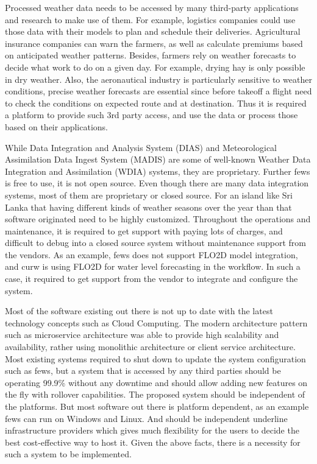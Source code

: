 Processed weather data needs to be accessed by many third-party applications and research to make use of them. For example, logistics companies could use those data with their models to plan and schedule their deliveries. Agricultural insurance companies can warn the farmers, as well as calculate premiums based on anticipated weather patterns. Besides, farmers rely on weather forecasts to decide what work to do on a given day. For example, drying hay is only possible in dry weather. Also, the aeronautical industry is particularly sensitive to weather conditions, precise weather forecasts are essential since before takeoff a flight need to check the conditions on expected route and at destination.
Thus it is required a platform to provide such 3rd party access, and use the data or process those based on their applications.

While Data Integration and Analysis System (DIAS) \cite{Kawasaki2018DataReduction} and Meteorological Assimilation Data Ingest System (MADIS) \cite{Macdermaid2005ARCHITECTUREP2.39} are some of well-known Weather Data Integration and Assimilation (WDIA) systems, they are proprietary. Further \acrfull{fews} \cite{Werner2013TheSystem} is free to use, it is not open source.
Even though there are many data integration systems, most of them are proprietary or closed source. For an island like Sri Lanka that having different kinds of weather seasons over the year than that software originated need to be highly customized. Throughout the operations and maintenance, it is required to get support with paying lots of charges, and difficult to debug into a closed source system without maintenance support from the vendors. As an example, \acrshort{fews} does not support FLO2D model integration, and \acrshort{curw} is using FLO2D for water level forecasting in the workflow. In such a case, it required to get support from the vendor to integrate and configure the system.

Most of the software existing out there is not up to date with the latest technology concepts such as Cloud Computing. The modern architecture pattern such as microservice architecture was able to provide high scalability and availability, rather using monolithic architecture or client service architecture. Most existing systems required to shut down to update the system configuration such as \acrshort{fews}, but a system that is accessed by any third parties should be operating 99.9\% without any downtime and should allow adding new features on the fly with rollover capabilities. The proposed system should be independent of the platforms. But most software out there is platform dependent, as an example \acrshort{fews} can run on Windows and Linux. And should be independent underline infrastructure providers which gives much flexibility for the users to decide the best cost-effective way to host it. Given the above facts, there is a necessity for such a system to be implemented.

